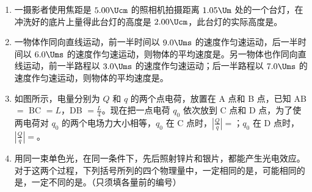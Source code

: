\documentclass[\gkver]{gaokaozhenti}
\begin{document}
\begin{enumerate}

\item
一摄影者使用焦距是 $5.00\Ucm$ 的照相机拍摄距离 $1.05\Um$ 处的一个台灯，在冲洗好的底片上量得此台灯的高度是 $2.00\Ucm$，此台灯的实际高度是\tkanswer{$40\Ucm$}。


\item
一物体作同向直线运动，前一半时间以 $9.0\Ums$ 的速度作匀速运动，后一半时间以 $6.0\Ums$ 的速度作匀速运动，则物体的平均速度是\tkanswer{$7.5\Ums$}。另一物体也作同向直线运动，前一半路程以 $3.0\Ums$ 的速度作匀速运动；后一半路程以 $7.0\Ums$ 的速度作匀速运动，则物体的平均速度是\tkanswer{$4.2\Ums$}。


\item
如图所示，电量分别为 $Q$ 和 $q$ 的两个点电荷，放置在 A 点和 B 点，已知 AB $=$ BC $=L$，DB $=\frac{L}{4}$。现在把一点电荷 $q_{0}$ 依次放到 C 点和 D 点，为了使两电荷对 $q_{0}$ 的两个电场力大小相等，$q_{0}$ 在 C 点时，$\left|\frac{Q}{q}\right|=$；$q_{0}$ 在 D 点时，$\left|\frac{Q}{q}\right|=$。
\onepicture[align=right, w=5.14cm]{}


\item
用同一束单色光，在同一条件下，先后照射锌片和银片，都能产生光电效应。对于这两个过程，下列括号所列的四个物理量中，一定相同的是，可能相同的是，一定不同的是。（只须填各量前的编号）


\end{enumerate}
\end{document}
